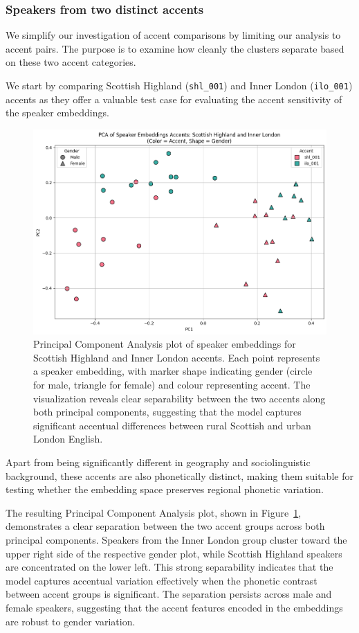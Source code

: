 \documentclass[conference]{IEEEtran}
\begin{document}
\subsubsection{Speakers from two distinct accents}

We simplify our investigation of accent comparisons by limiting our analysis to accent pairs. The purpose is to examine how cleanly the clusters separate based on these two accent categories.

We start by comparing  Scottish Highland (\texttt{shl\_001}) and Inner London (\texttt{ilo\_001}) accents as they offer a valuable test case for evaluating the accent sensitivity of the speaker embeddings. 


\begin{figure}[H]
	\centering
	\includegraphics[width=0.7\linewidth]{img/img-cluster-shl-ilo}
	\caption{Principal Component Analysis plot of speaker embeddings for Scottish Highland and Inner London  accents. Each point represents a speaker embedding, with marker shape indicating gender (circle for male, triangle for female) and colour representing accent. The visualization reveals clear separability between the two accents along both principal components, suggesting that the model captures significant accentual differences between rural Scottish and urban London English.}
	\label{fig:img-cluster-shl-ilo}
\end{figure}


Apart from being significantly different in geography and sociolinguistic background, these accents are also phonetically distinct, making them suitable for testing whether the embedding space preserves regional phonetic variation.

The resulting Principal Component Analysis plot, shown in Figure~\ref{fig:img-cluster-shl-ilo}, demonstrates a clear separation between the two accent groups across both principal components. Speakers from the Inner London group cluster toward the upper right side of the respective gender plot, while Scottish Highland speakers are concentrated on the lower left. This strong separability indicates that the model captures accentual variation effectively when the phonetic contrast between accent groups is significant. The separation persists across male and female speakers, suggesting that the accent features encoded in the embeddings are robust to gender variation.
\end{document}
